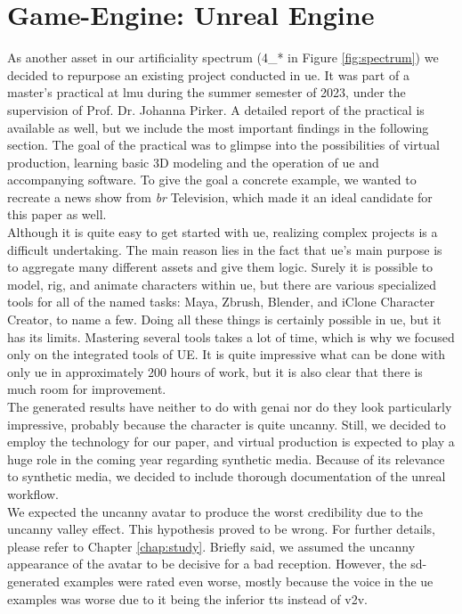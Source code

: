 \documentclass[
  a4paper,  %
  twoside,  %
  bibliography=totoc,
  headsepline,
  cleardoublepage=empty,
  parskip=half,
  draft=false
]{scrbook}
\begin{document}
\section{Game-Engine: Unreal Engine}
As another asset in our artificiality spectrum (4\_* in Figure \ref{fig:spectrum}) we decided to repurpose an existing project conducted in \gls{ue}. It was part of a master's practical at \gls{lmu} during the summer semester of 2023, under the supervision of Prof. Dr. Johanna Pirker. A detailed report of the practical is available as well, but we include the most important findings in the following section. The goal of the practical was to glimpse into the possibilities of virtual production, learning basic 3D modeling and the operation of \gls{ue} and accompanying software. To give the goal a concrete example, we wanted to recreate a news show from \textit{\gls{br}} Television, which made it an ideal candidate for this paper as well. \\
Although it is quite easy to get started with \gls{ue}, realizing complex projects is a difficult undertaking. The main reason lies in the fact that \gls{ue}'s main purpose is to aggregate many different assets and give them logic. Surely it is possible to model, rig, and animate characters within \gls{ue}, but there are various specialized tools for all of the named tasks: Maya, Zbrush, Blender, and iClone Character Creator, to name a few. Doing all these things is certainly possible in \gls{ue}, but it has its limits. Mastering several tools takes a lot of time, which is why we focused only on the integrated tools of UE. It is quite impressive what can be done with only \gls{ue} in approximately 200 hours of work, but it is also clear that there is much room for improvement. \\
The generated results have neither to do with \gls{genai} nor do they look particularly impressive, probably because the character is quite uncanny. Still, we decided to employ the technology for our paper, and virtual production is expected to play a huge role in the coming year regarding synthetic media. Because of its relevance to synthetic media, we decided to include thorough documentation of the unreal workflow. \\
We expected the uncanny avatar to produce the worst credibility due to the uncanny valley effect. This hypothesis proved to be wrong. For further details, please refer to Chapter \ref{chap:study}. Briefly said, we assumed the uncanny appearance of the avatar to be decisive for a bad reception. However, the \gls{sd}-generated examples were rated even worse, mostly because the voice in the \gls{ue} examples was worse due to it being the inferior \gls{tts} instead of \gls{v2v}.
\end{document}
